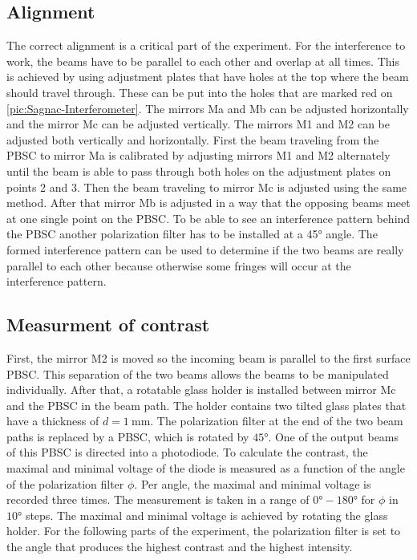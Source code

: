 \subsection{Alignment}
The correct alignment is a critical part of the experiment. For the interference to work, the beams have to be parallel to each other and 
overlap at all times. This is achieved by using adjustment plates that have holes at the top where the beam should travel through. 
These can be put into the holes that are marked red on \autoref{pic:Sagnac-Interferometer}. The mirrors Ma and Mb can be adjusted horizontally
and the mirror Mc can be adjusted vertically. The mirrors M1 and M2 can be adjusted both vertically and horizontally. 
First the beam traveling from 
the PBSC to mirror Ma is calibrated by adjusting mirrors M1 and M2 alternately until the beam is able to pass through both holes on the 
adjustment plates on points 2 and 3. Then the beam traveling to mirror Mc is adjusted using the same method. After that mirror Mb
is adjusted in a way that the opposing beams meet at one single point on the PBSC. To be able to see an interference pattern behind the PBSC 
another polarization filter has to be installed at a 45° angle. The formed interference pattern can be used to determine if the two beams 
are really parallel to each other because otherwise some fringes will occur at the interference pattern. 

\subsection{Measurment of contrast}
First, the mirror M2 is moved so the incoming beam is parallel to the first surface PBSC. This separation of the two beams allows the beams 
to be manipulated individually. After that, a rotatable glass holder is installed between mirror Mc and the PBSC in the beam path. 
The holder contains two tilted glass plates that have a thickness of $d = \SI{1}{\milli\meter}$. The polarization filter at the end 
of the two beam paths is replaced by a PBSC, which is rotated by $45°$. One of the output beams of this PBSC is directed into a 
photodiode. To calculate the contrast, the maximal and minimal voltage of the diode is measured as a function of the angle of the 
polarization filter $\phi$. Per angle, the maximal and minimal voltage is recorded three times. The measurement is taken in a range 
of $0° - 180°$ for $\phi$ in $10°$ steps. The maximal and minimal voltage is achieved by rotating the glass holder. 
For the following parts of the experiment, the polarization filter is set to the angle that produces the highest contrast and the 
highest intensity. 

